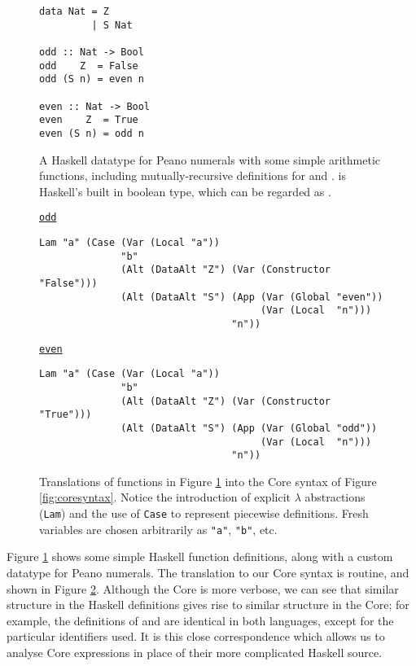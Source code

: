 \begin{figure}
  \begin{haskell}\begin{verbatim}
data Nat = Z
         | S Nat

odd :: Nat -> Bool
odd    Z  = False
odd (S n) = even n

even :: Nat -> Bool
even    Z  = True
even (S n) = odd n\end{verbatim}
  \end{haskell}
  \caption{A Haskell datatype for Peano numerals with some simple arithmetic functions, including mutually-recursive definitions for  and .  is Haskell's built in boolean type, which can be regarded as .}
  \label{fig:haskellexample}
\end{figure}

\begin{figure}
  \begin{small}
    \underline{\texttt{odd}}
    \begin{verbatim}
Lam "a" (Case (Var (Local "a"))
              "b"
              (Alt (DataAlt "Z") (Var (Constructor "False")))
              (Alt (DataAlt "S") (App (Var (Global "even"))
                                      (Var (Local  "n")))
                                 "n"))
    \end{verbatim}

    \underline{\texttt{even}}
    \begin{verbatim}
Lam "a" (Case (Var (Local "a"))
              "b"
              (Alt (DataAlt "Z") (Var (Constructor "True")))
              (Alt (DataAlt "S") (App (Var (Global "odd"))
                                      (Var (Local  "n")))
                                 "n"))
    \end{verbatim}
  \end{small}
  \caption{Translations of functions in Figure \ref{fig:haskellexample} into the Core syntax of Figure \ref{fig:coresyntax}. Notice the introduction of explicit $\lambda$ abstractions (\texttt{Lam}) and the use of \texttt{Case} to represent piecewise definitions. Fresh variables are chosen arbitrarily as \texttt{"a"}, \texttt{"b"}, etc.}
  \label{fig:coreexample}
\end{figure}

Figure \ref{fig:haskellexample} shows some simple Haskell function definitions, along with a custom datatype for Peano numerals. The translation to our Core syntax is routine, and shown in Figure \ref{fig:coreexample}. Although the Core is more verbose, we can see that similar structure in the Haskell definitions gives rise to similar structure in the Core; for example, the definitions of  and  are identical in both languages, except for the particular identifiers used. It is this close correspondence which allows us to analyse Core expressions in place of their more complicated Haskell source.

